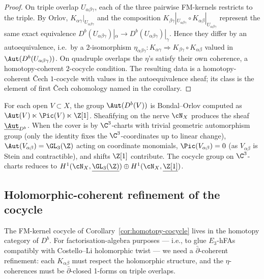 \begin{proof}
On triple overlap $U_{\alpha\beta\gamma}$, each of the three pairwise
FM-kernels restricts to the triple. By Orlov,
$K_{\alpha\gamma}|_{U_{\alpha\beta\gamma}}$ and the composition
$K_{\beta\gamma}|_{U_{\alpha\beta\gamma}} \circ
K_{\alpha\beta}|_{U_{\alpha\beta\gamma}}$ represent the same exact
equivalence $D^b(U_{\alpha\beta\gamma})|_\alpha \to
D^b(U_{\alpha\beta\gamma})|_\gamma$. Hence they differ by an
autoequivalence, i.e.\ by a $2$-isomorphism
$\eta_{\alpha\beta\gamma}: K_{\alpha\gamma} \Rightarrow
K_{\beta\gamma} \circ K_{\alpha\beta}$ valued in
$\Aut(D^b(U_{\alpha\beta\gamma}))$. On quadruple overlaps the
$\eta$'s satisfy their own coherence, a homotopy-coherent $2$-cocycle
condition. The resulting data is a homotopy-coherent Čech $1$-cocycle
with values in the autoequivalence sheaf; its class is the element
of first Čech cohomology named in the corollary.
\end{proof}

\begin{remark}
\label{rem:sheafified-autoequiv}
For each open $V \subset X$, the group $\Aut(D^b(V))$ is Bondal--Orlov
computed as $\Aut(V) \ltimes \Pic(V) \ltimes \Z[1]$. Sheafifying on
the nerve $\cN_X$ produces the sheaf
$\underline{\Aut}_{D^b}$. When the cover is by $\C^3$-charts with
trivial geometric automorphism group (only the identity fixes the
$\C^3$-coordinates up to linear change), $\Aut(V_{\alpha\beta}) =
\GL_3(\Z)$ acting on coordinate monomials, $\Pic(V_{\alpha\beta}) = 0$
(as $V_{\alpha\beta}$ is Stein and contractible), and shifts $\Z[1]$
contribute. The cocycle group on $\C^3$-charts reduces to
$H^1(\cN_X, \underline{\GL_3(\Z)}) \oplus H^1(\cN_X, \underline{\Z[1]})$.
\end{remark}

\subsection*{Holomorphic-coherent refinement of the cocycle}

The FM-kernel cocycle of Corollary~\ref{cor:homotopy-cocycle} lives in
the homotopy category of $D^b$. For factorisation-algebra purposes
--- i.e., to glue $E_3$-hFAs compatibly with Costello--Li holomorphic
twist --- we need a $\bar\partial$-coherent refinement: each
$K_{\alpha\beta}$ must respect the holomorphic structure, and the
$\eta$-coherences must be $\bar\partial$-closed 1-forms on triple
overlaps.


